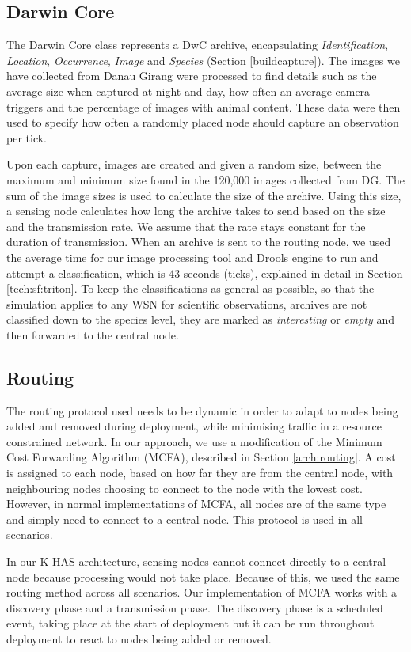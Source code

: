 \subsection{Darwin Core}\label{sims:exp:dwc}
The Darwin Core class represents a DwC archive, encapsulating \textit{Identification}, \textit{Location}, \textit{Occurrence}, \textit{Image} and \textit{Species} (Section \ref{buildcapture}). The images we have collected from Danau Girang were processed to find details such as the average size when captured at night and day, how often an average camera triggers and the percentage of images with animal content. These data were then used to specify how often a randomly placed node should capture an observation per tick.

Upon each capture, images are created and given a random size, between the maximum and minimum size found in the 120,000 images collected from DG. The sum of the image sizes is used to calculate the size of the archive. Using this size, a sensing node calculates how long the archive takes to send based on the size and the transmission rate. We assume that the rate stays constant for the duration of transmission.
When an archive is sent to the routing node, we used the average time for our image processing tool and Drools engine to run and attempt a classification, which is 43 seconds (ticks), explained in detail in Section \ref{tech:sf:triton}. To keep the classifications as general as possible, so that the simulation applies to any WSN for scientific observations, archives are not classified down to the species level, they are marked as \textit{interesting} or \textit{empty} and then forwarded to the central node.

\subsection{Routing}
The routing protocol used needs to be dynamic in order to adapt to nodes being added and removed during deployment, while minimising traffic in a resource constrained network. In our approach, we use a modification of the Minimum Cost Forwarding Algorithm (MCFA), described in Section \ref{arch:routing}. A cost is assigned to each node, based on how far they are from the central node, with neighbouring nodes choosing to connect to the node with the lowest cost. However, in normal implementations of MCFA, all nodes are of the same type and simply need to connect to a central node. This protocol is used in all scenarios.

In our K-HAS architecture, sensing nodes cannot connect directly to a central node because processing would not take place. Because of this, we used the same routing method across all scenarios. Our implementation of MCFA works with a discovery phase and a transmission phase. The discovery phase is a scheduled event, taking place at the start of deployment but it can be run throughout deployment to react to nodes being added or removed. 


